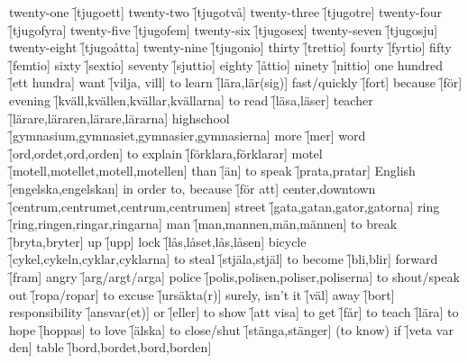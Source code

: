 \begin{questions}
    \begin{multicols}{2}
        \raggedcolumns
        \question twenty-one \f[tjugoett]
        \question twenty-two \f[tjugotvå]
        \question twenty-three \f[tjugotre]
        \question twenty-four \f[tjugofyra]
        \question twenty-five \f[tjugofem]
        \question twenty-six \f[tjugosex]
        \question twenty-seven \f[tjugosju]
        \question twenty-eight \f[tjugoåtta]
        \question twenty-nine \f[tjugonio]
        \question thirty \f[trettio]
        \question fourty \f[fyrtio]
        \question fifty \f[femtio]
        \question sixty \f[sextio]
        \question seventy \f[sjuttio]
        \question eighty \f[åttio]
        \question ninety \f[nittio]
        \question one hundred \f[ett hundra]
        \question want \f[vilja, vill]
        \question to learn \f[lära,lär(sig)]
        \question fast/quickly \f[fort]
        \question because \f[för]
        \question evening \f[kväll,kvällen,kvällar,kvällarna]
        \question to read \f[läsa,läser]
        \question teacher \f[lärare,läraren,lärare,lärarna]
        \question highschool \f[gymnasium,gymnasiet,gymnasier,gymnasierna]
        \question more \f[mer]
        \question word \f[ord,ordet,ord,orden]
        \question to explain \f[förklara,förklarar]
        \question motel \f[motell,motellet,motell,motellen]
        \question than \f[än]
        \question to speak \f[prata,pratar]
        \question English \f[engelska,engelskan]
        \question in order to, because \f[för att]
        \question center,downtown \f[centrum,centrumet,centrum,centrumen]
        \question street \f[gata,gatan,gator,gatorna]
        \question ring \f[ring,ringen,ringar,ringarna]
        \question man \f[man,mannen,män,männen]
        \question to break \f[bryta,bryter]
        \question up \f[upp]
        \question lock \f[lås,låset,lås,låsen]
        \question bicycle \f[cykel,cykeln,cyklar,cyklarna]
        \question to steal \f[stjäla,stjäl]
        \question to become \f[bli,blir]
        \question forward \f[fram]
        \question angry \f[arg/argt/arga]
        \question police \f[polis,polisen,poliser,poliserna]
        \question to shout/speak out \f[ropa/ropar]
        \question to excuse \f[ursäkta(r)]
        \question surely, isn't it \f[väl]
        \question away \f[bort]
        \question responsibility \f[ansvar(et)]
        \question or \f[eller]
        \question to show \f[att visa]
        \question to get \f[får]
        \question to teach \f[lära]
        \question to hope \f[hoppas]
        \question to love \f[älska]
        \question to close/shut \f[stänga,stänger]
        \question (to know) if \f[veta var den]
        \question table \f[bord,bordet,bord,borden]
    \end{multicols}
\end{questions}